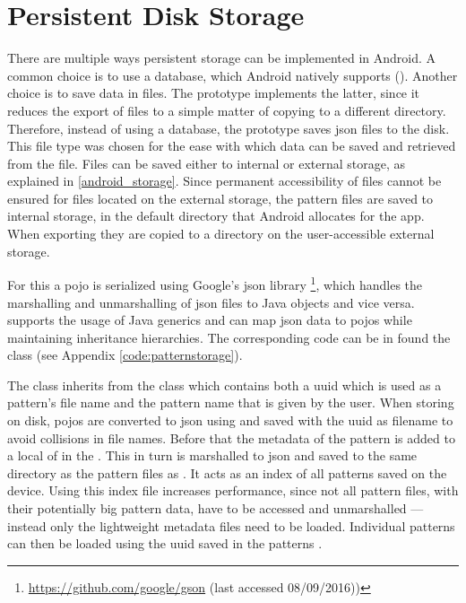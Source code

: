\section{Persistent Disk Storage}
\label{implementation_storage}
There are multiple ways persistent storage can be implemented in Android. A common choice is to use a  database, which Android natively supports (\cite{android_saving_data}). Another choice is to save data in files. The prototype implements the latter, since it reduces the export of files to a simple matter of copying to a different directory. Therefore, instead of using a database, the prototype saves \gls{json} files to the disk. This file type was chosen for the ease with which data can be saved and retrieved from the file. Files can be saved either to internal or external storage, as explained in \ref{android_storage}. Since permanent accessibility of files cannot be ensured for files located on the external storage, the pattern files are saved to internal storage, in the default directory that Android allocates for the app. When exporting they are copied to a directory on the user-accessible external storage. 

For this a  \gls{pojo} is serialized using Google’s \gls{json} library \footnote{\url{https://github.com/google/gson} (last accessed 08/09/2016))}, which handles the marshalling and unmarshalling of \gls{json} files to Java objects and vice versa.  supports the usage of Java generics and can map \gls{json} data to \gls{pojo}s while maintaining inheritance hierarchies. The corresponding code can be in found the class  (see Appendix \ref{code:patternstorage}).

The  class inherits from the class  which contains both a \gls{uuid} which is used as a pattern's file name and the pattern name that is given by the user. When storing on disk,  \gls{pojo}s are converted to \gls{json} using  and saved with the \gls{uuid} as filename to avoid collisions in file names. Before that the metadata of the pattern is added to a local  of  in the . This  in turn is marshalled to \gls{json} and saved to the same directory as the pattern files as . It acts as an index of all patterns saved on the device. Using this index file increases performance, since not all pattern files, with their potentially big pattern data, have to be accessed and unmarshalled --- instead only the lightweight metadata files need to be loaded. Individual patterns can then be loaded using the \gls{uuid} saved in the patterns .

